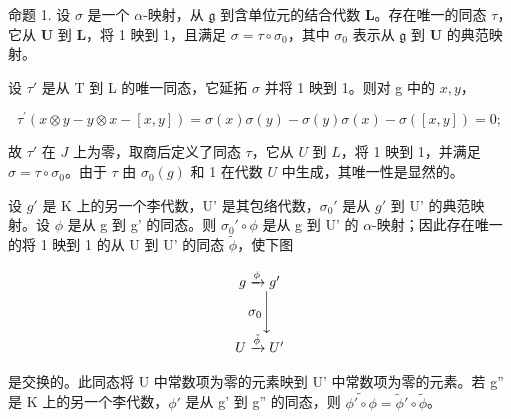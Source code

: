 命题 1. 设 \(\sigma\) 是一个 \(\alpha\)-映射，从 \(\mathfrak{g}\) 到含单位元的结合代数 \(\mathbf{L}\)。存在唯一的同态 \(\tau\)，它从 \(\mathbf{U}\) 到 \(\mathbf{L}\)，将 1 映到 1，且满足 \(\sigma = \tau \circ \sigma_0\)，其中 \(\sigma_0\) 表示从 \(\mathfrak{g}\) 到 \(\mathbf{U}\) 的典范映射。

设 \(\tau'\) 是从 T 到 L 的唯一同态，它延拓 \(\sigma\) 并将 1 映到 1。则对 g 中的 \(x, y\)，

\[
\tau^ {\prime} (x \otimes y - y \otimes x - [ x, y ]) = \sigma (x) \sigma (y) - \sigma (y) \sigma (x) - \sigma ([ x, y ]) = 0;
\]

故 \(\tau'\) 在 \(J\) 上为零，取商后定义了同态 \(\tau\)，它从 \(U\) 到 \(L\)，将 1 映到 1，并满足 \(\sigma = \tau \circ \sigma_0\)。由于 \(\tau\) 由 \(\sigma_0(g)\) 和 1 在代数 \(U\) 中生成，其唯一性是显然的。

设 \(g'\) 是 K 上的另一个李代数，U' 是其包络代数，\(\sigma_0'\) 是从 \(g'\) 到 U' 的典范映射。设 \(\phi\) 是从 g 到 g' 的同态。则 \(\sigma_0' \circ \phi\) 是从 g 到 U' 的 \(\alpha\)-映射；因此存在唯一的将 1 映到 1 的从 U 到 U' 的同态 \(\tilde{\phi}\)，使下图

\[
\begin{array}{c} g \xrightarrow {\phi} g ^ {\prime} \\ \sigma_ {0} \Biggl \downarrow \\ U \xrightarrow {\tilde {\phi}} U ^ {\prime} \end{array}
\]

是交换的。此同态将 U 中常数项为零的元素映到 U' 中常数项为零的元素。若 g'' 是 K 上的另一个李代数，\(\phi'\) 是从 g' 到 g'' 的同态，则 \(\widetilde{\phi'\circ\phi}=\widetilde{\phi}'\circ\widetilde{\phi}\)。

